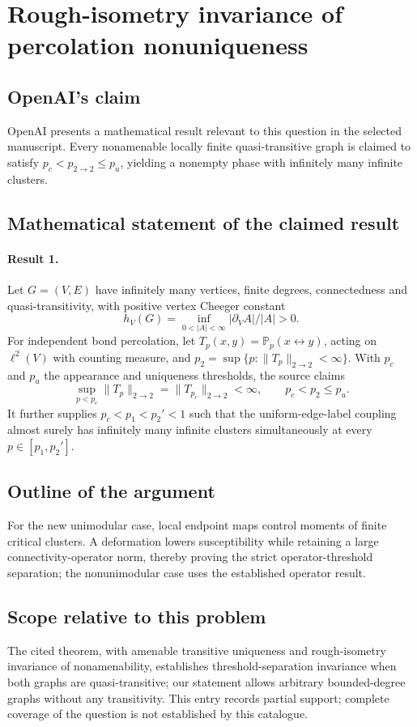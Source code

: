 \documentclass[11pt]{article}
\begin{document}
\section*{Rough-isometry invariance of percolation nonuniqueness}

\subsection{OpenAI's claim}
OpenAI presents a mathematical result relevant to this question in the selected manuscript. Every nonamenable locally finite quasi-transitive graph is claimed to satisfy $p_c<p_{2\to2}\leq p_u$, yielding a nonempty phase with infinitely many infinite clusters.

\subsection{Mathematical statement of the claimed result}
\paragraph{Result 1.} Let \(G=(V,E)\) have infinitely many vertices, finite degrees, connectedness and quasi-transitivity, with positive vertex Cheeger constant
\[
 h_V(G)=\inf_{0<|A|<\infty}|\partial_VA|/|A|>0.
\]
For independent bond percolation, let \(T_p(x,y)=\mathbb P_p(x\leftrightarrow y)\), acting on \(\ell^2(V)\) with counting measure, and \(p_2=\sup\{p:\|T_p\|_{2\to2}<\infty\}\). With \(p_c\) and \(p_u\) the appearance and uniqueness thresholds, the source claims
\[
 \sup_{p<p_c}\|T_p\|_{2\to2}=\|T_{p_c}\|_{2\to2}<\infty,
 \qquad p_c<p_2\le p_u.
\]
It further supplies \(p_c<p_1<p_2'<1\) such that the uniform-edge-label coupling almost surely has infinitely many infinite clusters simultaneously at every \(p\in[p_1,p_2']\).

\subsection{Outline of the argument}
For the new unimodular case, local endpoint maps control moments of finite critical clusters. A deformation lowers susceptibility while retaining a large connectivity-operator norm, thereby proving the strict operator-threshold separation; the nonunimodular case uses the established operator result.

\subsection{Scope relative to this problem}
The cited theorem, with amenable transitive uniqueness and rough-isometry invariance of nonamenability, establishes threshold-separation invariance when both graphs are quasi-transitive; our statement allows arbitrary bounded-degree graphs without any transitivity. This entry records partial support; complete coverage of the question is not established by this catalogue.
\end{document}
